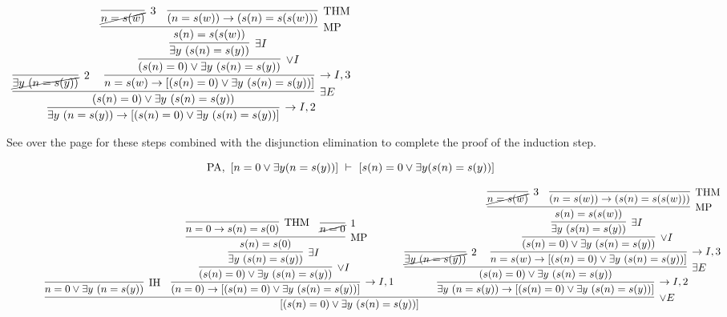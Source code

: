 \documentclass[11pt]{report}
\begin{document}
\begin{enumerate}
\begin{enumerate}
		\begin{mdframed}
			\begin{center}
				$\begin{array}{c}
					\infer[\to I,2]{\exists y \ (n=s(y)) \to [(s(n)=0) \lor \exists y \ (s(n)=s(y))]}
								{\infer[\exists E]{(s(n)=0) \lor \exists y \ (s(n)=s(y))}
									{\infer[2]{\cancel{\exists y \ (n=s(y))}}{}
									&
									\infer[\to I,3]{n=s(w) \to [(s(n)=0) \lor \exists y \ (s(n)=s(y))]}
										{\infer[\lor I]{(s(n)=0) \lor \exists y \ (s(n)=s(y))}
											{\infer[\exists I]{\exists y \ (s(n)=s(y))}
												{\infer[\MP]{s(n)=s(s(w))}
													{\infer[3]{\cancel{n=s(w)}}{}
													&
													\infer[\THM]{(n=s(w)) \to (s(n)=s(s(w)))}
														{}
													}}}}}}
				\end{array}$
			\end{center}
		\end{mdframed}

		See over the page for these steps combined with the disjunction elimination to complete the proof of the induction step. 
		
		\begin{sidewaysfigure}

			$$ \text{PA}, \ [n = 0 \lor \exists y (n = s(y))] \ \vdash \ [s(n) = 0 \lor \exists y (s(n) = s(y))]$$

			\begin{mdframed}
				\begin{center}
					\small{$\begin{array}{c}
						\infer[\lor E]{[(s(n)=0) \lor \exists y \ (s(n)=s(y))]}
							{\infer[\IH]{n=0 \lor \exists y \ (n = s(y))}{}
							&
							\infer[\to I,1]{(n=0) \to [(s(n)=0) \lor \exists y \ (s(n)=s(y))]}
								{\infer[\lor I]{(s(n)=0) \lor \exists y \ (s(n)=s(y))}
									{\infer[\exists I]{\exists y \ (s(n)=s(y))}
										{\infer[\MP]{s(n)=s(0)}
											{\infer[\THM]{n=0 \to s(n)=s(0)}{}
											&
											\infer[1]{\cancel{n=0}}{}}}}}
							&
							\infer[\to I,2]{\exists y \ (n=s(y)) \to [(s(n)=0) \lor \exists y \ (s(n)=s(y))]}
								{\infer[\exists E]{(s(n)=0) \lor \exists y \ (s(n)=s(y))}
									{\infer[2]{\cancel{\exists y \ (n=s(y))}}{}
									&
									\infer[\to I,3]{n=s(w) \to [(s(n)=0) \lor \exists y \ (s(n)=s(y))]}
										{\infer[\lor I]{(s(n)=0) \lor \exists y \ (s(n)=s(y))}
											{\infer[\exists I]{\exists y \ (s(n)=s(y))}
												{\infer[\MP]{s(n)=s(s(w))}
													{\infer[3]{\cancel{n=s(w)}}{}
													&
													\infer[\THM]{(n=s(w)) \to (s(n)=s(s(w)))}
														{}
													}}}}}}}
					\end{array}$}
				\end{center}
			\end{mdframed}
		\end{sidewaysfigure}		
		

\end{enumerate}
\end{enumerate}
\end{document}
